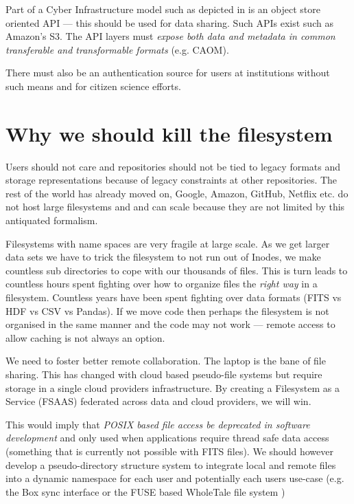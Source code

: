 Part of a Cyber Infrastructure model such as depicted in  is an object store oriented \gls{API} --- this should be used for data sharing. Such APIs exist such as Amazon's S3.
The  \gls{API} layers must \emph{expose both data and \gls{metadata} in common
transferable and transformable formats} (e.g. \gls{CAOM}).


There must also be an authentication source for users at institutions without such means and for citizen science efforts.

\section{Why we should kill the filesystem}

Users should not care and repositories should not be tied to legacy formats  and storage representations because of legacy constraints  at other repositories.
The rest of the world has already moved on,  Google, Amazon, GitHub, Netflix etc. do not host large filesystems and and can scale because they are not limited by this antiquated formalism.

Filesystems with name spaces are very fragile at large scale. As we get larger data sets we have to trick the filesystem to not run out of Inodes, we make countless sub directories to cope with our thousands of files.
This is turn leads to countless hours spent fighting over how to organize files  the \emph{right way} in a filesystem.
Countless years have been spent fighting over data formats (\gls{FITS} vs \gls{HDF} \citep{2015ASPC..495...11M} vs \gls{CSV} vs Pandas).
If we move code then perhaps the filesystem is not organised in the same manner and the code may not work --- remote access to allow caching is not always an option.

We need to foster better remote collaboration.  The laptop is the bane of file sharing.
This has changed with cloud based pseudo-file systems but require storage in a single
cloud providers infrastructure. By creating a Filesystem as a Service (\gls{FSAAS}) federated
across data and cloud providers, we will win.

This would imply that \emph{POSIX based file access be deprecated
in software development} and only used when applications require thread safe
data access (something that is currently not possible with \gls{FITS} files).
We should however  develop a pseudo-directory structure system to
integrate local and remote files into a dynamic namespace for each user and potentially
each users use-case (e.g. the Box sync interface or the \gls{FUSE} based WholeTale file system
\citep{BRINCKMAN2019854})

